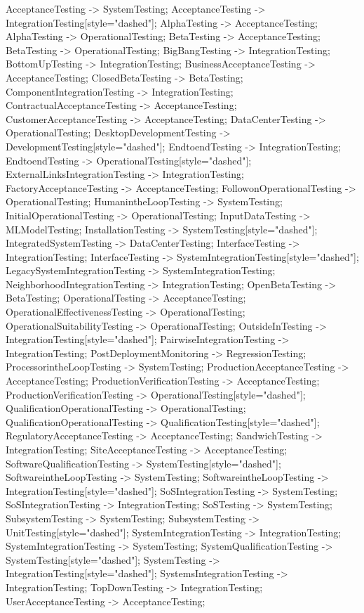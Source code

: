 \documentclass{article}
\begin{document}
{AcceptanceTesting -> SystemTesting;
AcceptanceTesting -> IntegrationTesting[style="dashed"];
AlphaTesting -> AcceptanceTesting;
AlphaTesting -> OperationalTesting;
BetaTesting -> AcceptanceTesting;
BetaTesting -> OperationalTesting;
BigBangTesting -> IntegrationTesting;
BottomUpTesting -> IntegrationTesting;
BusinessAcceptanceTesting -> AcceptanceTesting;
ClosedBetaTesting -> BetaTesting;
ComponentIntegrationTesting -> IntegrationTesting;
ContractualAcceptanceTesting -> AcceptanceTesting;
CustomerAcceptanceTesting -> AcceptanceTesting;
DataCenterTesting -> OperationalTesting;
DesktopDevelopmentTesting -> DevelopmentTesting[style="dashed"];
EndtoendTesting -> IntegrationTesting;
EndtoendTesting -> OperationalTesting[style="dashed"];
ExternalLinksIntegrationTesting -> IntegrationTesting;
FactoryAcceptanceTesting -> AcceptanceTesting;
FollowonOperationalTesting -> OperationalTesting;
HumanintheLoopTesting -> SystemTesting;
InitialOperationalTesting -> OperationalTesting;
InputDataTesting -> MLModelTesting;
InstallationTesting -> SystemTesting[style="dashed"];
IntegratedSystemTesting -> DataCenterTesting;
InterfaceTesting -> IntegrationTesting;
InterfaceTesting -> SystemIntegrationTesting[style="dashed"];
LegacySystemIntegrationTesting -> SystemIntegrationTesting;
NeighborhoodIntegrationTesting -> IntegrationTesting;
OpenBetaTesting -> BetaTesting;
OperationalTesting -> AcceptanceTesting;
OperationalEffectivenessTesting -> OperationalTesting;
OperationalSuitabilityTesting -> OperationalTesting;
OutsideInTesting -> IntegrationTesting[style="dashed"];
PairwiseIntegrationTesting -> IntegrationTesting;
PostDeploymentMonitoring -> RegressionTesting;
ProcessorintheLoopTesting -> SystemTesting;
ProductionAcceptanceTesting -> AcceptanceTesting;
ProductionVerificationTesting -> AcceptanceTesting;
ProductionVerificationTesting -> OperationalTesting[style="dashed"];
QualificationOperationalTesting -> OperationalTesting;
QualificationOperationalTesting -> QualificationTesting[style="dashed"];
RegulatoryAcceptanceTesting -> AcceptanceTesting;
SandwichTesting -> IntegrationTesting;
SiteAcceptanceTesting -> AcceptanceTesting;
SoftwareQualificationTesting -> SystemTesting[style="dashed"];
SoftwareintheLoopTesting -> SystemTesting;
SoftwareintheLoopTesting -> IntegrationTesting[style="dashed"];
SoSIntegrationTesting -> SystemTesting;
SoSIntegrationTesting -> IntegrationTesting;
SoSTesting -> SystemTesting;
SubsystemTesting -> SystemTesting;
SubsystemTesting -> UnitTesting[style="dashed"];
SystemIntegrationTesting -> IntegrationTesting;
SystemIntegrationTesting -> SystemTesting;
SystemQualificationTesting -> SystemTesting[style="dashed"];
SystemTesting -> IntegrationTesting[style="dashed"];
SystemsIntegrationTesting -> IntegrationTesting;
TopDownTesting -> IntegrationTesting;
UserAcceptanceTesting -> AcceptanceTesting;

}
\end{document}
